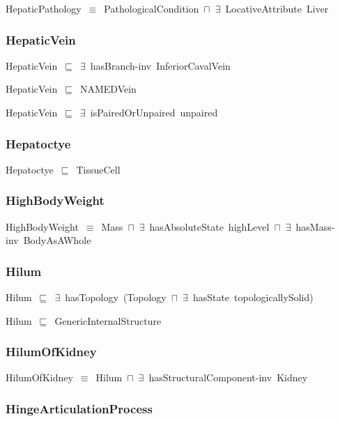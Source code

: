 \documentclass{article}
\begin{document}
HepaticPathology~\ensuremath{\equiv}~PathologicalCondition~\ensuremath{\sqcap}~\ensuremath{\exists}~LocativeAttribute~Liver

\subsubsection*{HepaticVein}

HepaticVein~\ensuremath{\sqsubseteq}~\ensuremath{\exists}~hasBranch-inv~InferiorCavalVein~

HepaticVein~\ensuremath{\sqsubseteq}~NAMEDVein~

HepaticVein~\ensuremath{\sqsubseteq}~\ensuremath{\exists}~isPairedOrUnpaired~unpaired~

\subsubsection*{Hepatoctye}

Hepatoctye~\ensuremath{\sqsubseteq}~TissueCell~

\subsubsection*{HighBodyWeight}

HighBodyWeight~\ensuremath{\equiv}~Mass~\ensuremath{\sqcap}~\ensuremath{\exists}~hasAbsoluteState~highLevel~\ensuremath{\sqcap}~\ensuremath{\exists}~hasMass-inv~BodyAsAWhole

\subsubsection*{Hilum}

Hilum~\ensuremath{\sqsubseteq}~\ensuremath{\exists}~hasTopology~(Topology~\ensuremath{\sqcap}~\ensuremath{\exists}~hasState~topologicallySolid)~

Hilum~\ensuremath{\sqsubseteq}~GenericInternalStructure~

\subsubsection*{HilumOfKidney}

HilumOfKidney~\ensuremath{\equiv}~Hilum~\ensuremath{\sqcap}~\ensuremath{\exists}~hasStructuralComponent-inv~Kidney

\subsubsection*{HingeArticulationProcess}
\end{document}
